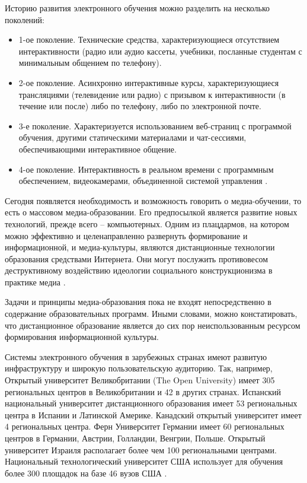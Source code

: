 Историю развития электронного обучения можно разделить на несколько поколений:

\begin{itemize}
\item 1-ое поколение. Технические средства, характеризующиеся отсутствием интерактивности (радио или аудио кассеты, учебники, посланные студентам с минимальным общением по телефону).
\item 2-ое поколение. Асинхронно интерактивные курсы, характеризующиеся трансляциями (телевидение или радио) с призывом к интерактивности (в течение или после) либо по телефону, либо по электронной почте.
\item 3-е поколение. Характеризуется использованием веб-страниц с программой обучения, другими статическими материалами и чат-сессиями, обеспечивающими интерактивное общение.
\item 4-ое поколение. Интерактивность в реальном времени с программным обеспечением, видеокамерами, объединенной системой управления \cite{rad2005create}.
\end{itemize}

Сегодня появляется необходимость и возможность говорить о медиа-обучении, то есть о массовом медиа-образовании\cite{dabbagh2012personal}. Его предпосылкой является развитие новых технологий, прежде всего – компьютерных. Одним из плацдармов, на котором можно эффективно и целенаправленно развернуть формирование и информационной, и медиа-культуры, являются дистанционные технологии образования средствами Интернета. Они могут послужить противовесом деструктивному воздействию идеологии социального конструкционизма в практике медиа \cite{kalmikov2009learning}.

Задачи и принципы медиа-образования пока не входят непосредственно в содержание образовательных программ. Иными словами, можно констатировать, что дистанционное образование является до сих пор неиспользованным ресурсом формирования информационной культуры. 

Системы электронного обучения в зарубежных странах имеют развитую инфраструктуру и широкую пользовательскую аудиторию. Так, например, Открытый университет Великобритании (The Open University) имеет 305 региональных центров в Великобритании и 42 в других странах. Испанский национальный университет дистанционного образования имеет 53 региональных центра в Испании и Латинской Америке. Канадский открытый университет имеет 4 региональных центра. Ферн Университет Германии имеет 60 региональных центров в Германии, Австрии, Голландии, Венгрии, Польше. Открытый университет Израиля располагает более чем 100 региональными центрами. Национальный технологический университет США использует для обучения более 300 площадок на базе 46 вузов США \cite{korneeva2007state}. 

